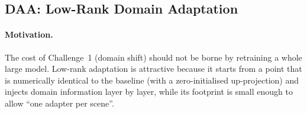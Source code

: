 \begin{table}[t]
\centering
\small
\caption{Tensor shapes of \evivad{} ($T{=}32$, $D{=}768$; $K$ is the number of prompts and $N$ the memory size).}
\label{tab:tensor}
\end{table}

\subsection{DAA: Low-Rank Domain Adaptation}

\paragraph{Motivation.} The cost of Challenge~1 (domain shift) should not be borne by retraining a whole large model. Low-rank adaptation is attractive because it starts from a point that is numerically identical to the baseline (with a zero-initialised up-projection) and injects domain information layer by layer, while its footprint is small enough to allow ``one adapter per scene''.

